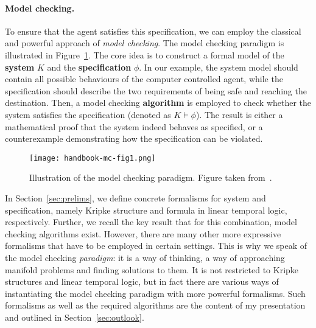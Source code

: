 \documentclass[11pt]{article}
\begin{document}
\paragraph{Model checking.}
To ensure that the agent satisfies this specification, we can employ the classical and powerful approach of \emph{model checking}.
The model checking paradigm is illustrated in Figure~\ref{fig:mc-paradigm}.
The core idea is to construct a formal model of the \textbf{system} $K$ and the \textbf{specification} $\phi$.
In our example, the system model should contain all possible behaviours of the computer controlled agent, while the specification should describe the two requirements of being safe and reaching the destination.
Then, a model checking \textbf{algorithm} is employed to check whether the system satisfies the specification (denoted as $K \models \phi$). 
The result is either a mathematical proof that the system indeed behaves as specified, or a counterexample demonstrating how the specification can be violated.


\begin{figure}[t]
	\centering
	\texttt{[image: handbook-mc-fig1.png]}
	\caption{Illustration of the model checking paradigm. Figure taken from~\cite[Figure 1]{handbook}.}
	\label{fig:mc-paradigm}
\end{figure}

\medskip
In Section~\ref{sec:prelims}, we define concrete formalisms for system and specification, namely Kripke structure and formula in linear temporal logic, respectively. Further, we recall the key result that for this combination, model checking algorithms exist.
However, there are many other more expressive formalisms that have to be employed in certain settings.
This is why we speak of the model checking \emph{paradigm}: it is a way of thinking, a way of approaching manifold problems and finding solutions to them.
It is not restricted to Kripke structures and linear temporal logic, but in fact there are various ways of instantiating the model checking paradigm with more powerful formalisms.
Such formalisms as well as the required algorithms are the content of my presentation and outlined in Section~\ref{sec:outlook}.
\end{document}
